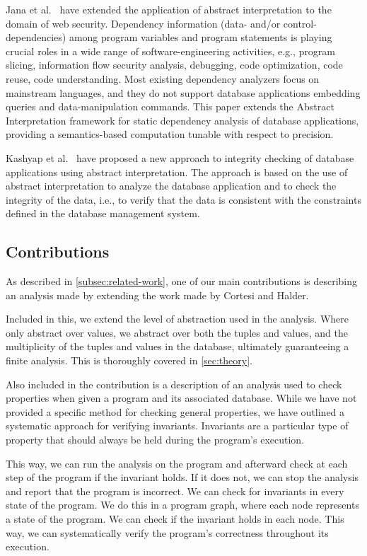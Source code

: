 Jana et al.~\cite{jana_extending_2020} have extended the application of abstract interpretation to the domain of web security.
Dependency information (data- and/or control-dependencies) among program variables and program statements is playing crucial roles in a wide range of software-engineering activities, e.g., program slicing, information flow security analysis, debugging, code optimization, code reuse, code understanding.
Most existing dependency analyzers focus on mainstream languages, and they do not support database applications embedding queries and data-manipulation commands.
This paper extends the Abstract Interpretation framework for static dependency analysis of database applications, providing a semantics-based computation tunable with respect to precision.

Kashyap et al.~\cite{kashyap_integrity_2022} have proposed a new approach to integrity checking of database applications using abstract interpretation.
The approach is based on the use of abstract interpretation to analyze the database application and to check the integrity of the data, i.e., to verify that the data is consistent with the constraints defined in the database management system.


\subsection{Contributions}\label{subsec:contributions}
As described in \autoref{subsec:related-work}, one of our main contributions is describing an analysis made by extending the work made by Cortesi and Halder.

Included in this, we extend the level of abstraction used in the analysis.
Where~\cite{halder_abstract_2012} only abstract over values, we abstract over both the tuples and values, and the multiplicity of the tuples and values in the database, ultimately guaranteeing a finite analysis.
This is thoroughly covered in \autoref{sec:theory}.

Also included in the contribution is a description of an analysis used to check properties when given a program and its associated database.
While we have not provided a specific method for checking general properties, we have outlined a systematic approach for verifying invariants.
Invariants are a particular type of property that should always be held during the program's execution.

This way, we can run the analysis on the program and afterward check at each step of the program if the invariant holds.
If it does not, we can stop the analysis and report that the program is incorrect.
We can check for invariants in every state of the program.
We do this in a program graph, where each node represents a state of the program.
We can check if the invariant holds in each node.
This way, we can systematically verify the program's correctness throughout its execution.

